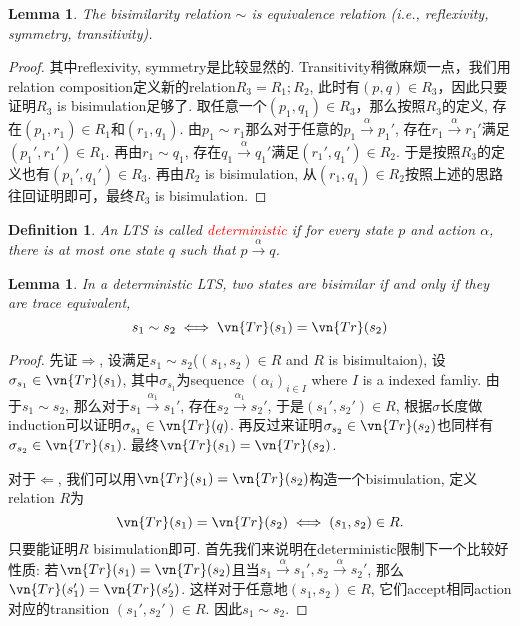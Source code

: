 \documentclass{article}
\newtheorem{lemma}[theorem]{Lemma}
\newtheorem{definition}[theorem]{Definition}
\newcommand{\redt}[1]{\textcolor{red}{#1}}
\begin{document}
\begin{lemma}
\rm \cite{AITBAC} The bisimilarity relation $\sim$ is equivalence relation (i.e., reflexivity, symmetry, transitivity).
\end{lemma}

\begin{proof}
\rm 其中reflexivity, symmetry是比较显然的. Transitivity稍微麻烦一点，我们用relation composition定义新的relation$R_3 = R_1;R_2$, 此时有$(p,q) \in R_3$，因此只要证明$R_3$ is bisimulation足够了. 取任意一个$(p_1, q_1) \in R_3$，那么按照$R_3$的定义, 存在$(p_1, r_1) \in R_1$和$(r_1, q_1)$. 由$p_1 \sim r_1$那么对于任意的$p_1 \xrightarrow{\alpha} p_1'$, 存在$r_1 \xrightarrow{\alpha} r_1'$满足$(p_1',r_1') \in R_1$. 再由$r_1 \sim q_1$, 存在$q_1 \xrightarrow{\alpha} q_1'$满足$(r_1',q_1') \in R_2$. 于是按照$R_3$的定义也有$(p_1', q_1') \in R_3$. 再由$R_2$ is bisimulation, 从$(r_1,q_1) \in R_2$按照上述的思路往回证明即可，最终$R_3$ is bisimulation.
\end{proof}

\begin{definition}
\rm \cite{mLTS} An LTS is called \redt{deterministic} if for every state $p$ and action $\alpha$, there is at most one state $q$ such that $p \xrightarrow{\alpha} q$.
\end{definition}

\begin{lemma}
\rm In a deterministic LTS, two states are bisimilar if and only if they are trace equivalent,
\[
	s_1 \sim s_2 \iff \vn{Tr}(s_1)=\vn{Tr}(s_2)
\]
\end{lemma}

\begin{proof}
\rm 

先证$\Rightarrow$, 设满足$s_1 \sim s_2$($(s_1,s_2) \in R$ and $R$ is bisimultaion), 设$\sigma_{s_1} \in \vn{Tr}(s_1)$, 其中$\sigma_{s_1}$为sequence $(\alpha_i)_{i \in I}$ where $I$ is a indexed famliy. 由于$s_1 \sim s_2$, 那么对于$s_1 \xrightarrow{\alpha_1} s_1'$, 存在$s_2 \xrightarrow{\alpha_1} s_2'$, 于是$(s_1',s_2') \in R$, 根据$\sigma$长度做induction可以证明$\sigma_{s_1} \in \vn{Tr}(q)$. 再反过来证明$\sigma_{s_2} \in \vn{Tr}(s_2)$也同样有$\sigma_{s_2} \in \vn{Tr}(s_1)$. 最终$\vn{Tr}(s_1)=\vn{Tr}(s_2)$.

对于$\Leftarrow$, 我们可以用$\vn{Tr}(s_1) = \vn{Tr}(s_2)$构造一个bisimulation, 定义relation $R$为
\[
 	\vn{Tr}(s_1) = \vn{Tr}(s_2) \iff (s_1,s_2) \in R.
\]
只要能证明$R$ bisimulation即可. 首先我们来说明在deterministic限制下一个比较好性质: 若$\vn{Tr}(s_1) = \vn{Tr}(s_2)$且当$s_1 \xrightarrow{\alpha} s_1', s_2 \xrightarrow{\alpha} s_2'$, 那么$\vn{Tr}(s_1') = \vn{Tr}(s_2')$. 这样对于任意地$(s_1,s_2) \in R$, 它们accept相同action对应的transition $(s_1', s_2') \in R$. 因此$s_1 \sim s_2$. 
\end{proof}
\end{document}
